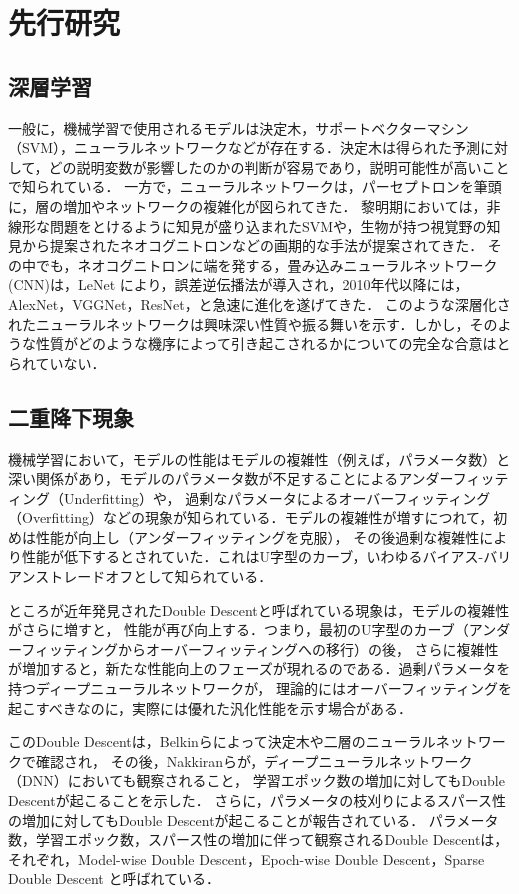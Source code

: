 \chapter{先行研究}
\section{深層学習}
一般に，機械学習で使用されるモデルは決定木，サポートベクターマシン（SVM），ニューラルネットワークなどが存在する．決定木は得られた予測に対して，どの説明変数が影響したのかの判断が容易であり，説明可能性が高いことで知られている．
一方で，ニューラルネットワークは，パーセプトロンを筆頭に，層の増加やネットワークの複雑化が図られてきた．
黎明期においては，非線形な問題をとけるように知見が盛り込まれたSVMや，生物が持つ視覚野の知見から提案されたネオコグニトロンなどの画期的な手法が提案されてきた．
その中でも，ネオコグニトロンに端を発する，畳み込みニューラルネットワーク(CNN)は，LeNet \cite{LeNet}により，誤差逆伝播法が導入され，2010年代以降には，AlexNet\cite{AlexNet}，VGGNet\cite{VGGNet}，ResNet\cite{ResNet}，と急速に進化を遂げてきた．
このような深層化されたニューラルネットワークは興味深い性質や振る舞いを示す．しかし，そのような性質がどのような機序によって引き起こされるかについての完全な合意はとられていない．

\newpage

\section{二重降下現象}
機械学習において，モデルの性能はモデルの複雑性（例えば，パラメータ数）と深い関係があり，モデルのパラメータ数が不足することによるアンダーフィッティング（Underfitting）や，
過剰なパラメータによるオーバーフィッティング（Overfitting）などの現象が知られている．モデルの複雑性が増すにつれて，初めは性能が向上し（アンダーフィッティングを克服），
その後過剰な複雑性により性能が低下するとされていた．これはU字型のカーブ，いわゆるバイアス-バリアンストレードオフ\cite{Rajnarayan2017-ml,Belkin2018-yx}として知られている．

ところが近年発見されたDouble Descent\cite{Belkin_2019}と呼ばれている現象は，モデルの複雑性がさらに増すと，
性能が再び向上する．つまり，最初のU字型のカーブ（アンダーフィッティングからオーバーフィッティングへの移行）の後，
さらに複雑性が増加すると，新たな性能向上のフェーズが現れるのである．過剰パラメータを持つディープニューラルネットワークが，
理論的にはオーバーフィッティングを起こすべきなのに，実際には優れた汎化性能を示す場合がある\cite{ResNet, ViT}．

このDouble Descentは，Belkinら\cite{Belkin_2019}によって決定木や二層のニューラルネットワークで確認され，
その後，Nakkiranら\cite{Nakkiran2021}が，ディープニューラルネットワーク（DNN）においても観察されること，
学習エポック数の増加に対してもDouble Descentが起こることを示した．
さらに，パラメータの枝刈りによるスパース性の増加に対してもDouble Descentが起こることが報告されている\cite{He2016-et}．
パラメータ数，学習エポック数，スパース性の増加に伴って観察されるDouble Descentは，
それぞれ，Model-wise Double Descent，Epoch-wise Double Descent，Sparse Double Descent と呼ばれている\cite{Nakkiran2021, He2016-et}．

